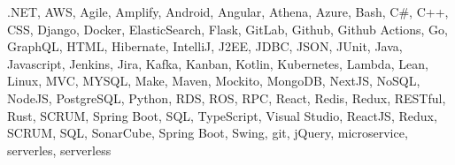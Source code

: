 \vspace{\SpacerAboveTopic}

\item{
.NET,
AWS,
Agile,
Amplify,
Android,
Angular,
Athena,
Azure,
Bash,
C\#,
C++,
CSS,
Django,
Docker,
ElasticSearch,
Flask,
GitLab,
Github,
Github
Actions,
Go,
GraphQL,
HTML,
Hibernate,
IntelliJ,
J2EE,
JDBC,
JSON,
JUnit,
Java,
Javascript,
Jenkins,
Jira,
Kafka,
Kanban,
Kotlin,
Kubernetes,
Lambda,
Lean,
Linux,
MVC,
MYSQL,
Make,
Maven,
Mockito,
MongoDB,
NextJS,
NoSQL,
NodeJS,
PostgreSQL,
Python,
RDS,
ROS,
RPC,
React,
Redis,
Redux,
RESTful,
Rust,
SCRUM,
Spring Boot,
SQL,
TypeScript,
Visual Studio,
ReactJS,
Redux,
SCRUM,
SQL,
SonarCube,
Spring
Boot,
Swing,
git,
jQuery,
microservice,
serverles,
serverless
}

\vspace{\SpacerBelowTopic}